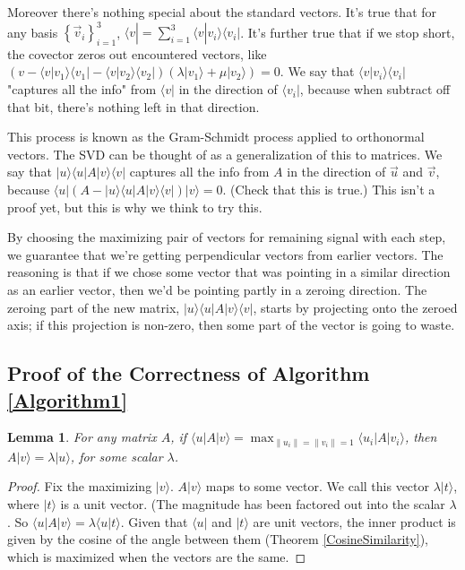 \documentclass{amsbook}
\newtheorem{lemma}[theorem]{Lemma}
\begin{document}
\begin{tcolorbox}[title=Example: Covector Analogy,colback=blue!5]
Moreover there's nothing special about the standard vectors.  It's true that for any basis $\left\{\vec v _i\right\}_{i=1}^3$, $\langle v| = \sum_{i=1}^3\langle v| v _i\rangle\langle v _i|$.  It's further true that if we stop short, the covector zeros out encountered vectors, like $\left(v-\langle v| v _1\rangle\langle v _1|-\langle v| v _2\rangle\langle v _2|\right)\left(\lambda| v _1\rangle+\mu| v _2\rangle\right)=0$.  We say that $\langle v| v _i\rangle\langle v _i|$ "captures all the info" from $\langle v|$ in the direction of $\langle v _i|$, because when subtract off that bit, there's nothing left in that direction.

This process is known as the Gram-Schmidt process applied to orthonormal vectors.  The SVD can be thought of as a generalization of this to matrices.  We say that $| u \rangle\langle u |A| v \rangle\langle v |$ captures all the info from  $A$ in the direction of $\vec u $ and $\vec v $, because $\langle u |\left(A-| u \rangle\langle u |A| v \rangle\langle v |\right)| v \rangle=0$.  (Check that this is true.)  This isn't a proof yet, but this is why we think to try this.

By choosing the maximizing pair of vectors for remaining signal with each step, we guarantee that we're getting perpendicular vectors from earlier vectors.  The reasoning is that if we chose some vector that was pointing in a similar direction as an earlier vector, then we'd be pointing partly in a zeroing direction.  The zeroing part of the new matrix, $| u \rangle\langle u |A| v \rangle\langle v |$, starts by projecting onto the zeroed axis; if this projection is non-zero, then some part of the vector is going to waste.
\end{tcolorbox}

\subsection{Proof of the Correctness of Algorithm \ref{Algorithm1}}

\begin{lemma}
\label{MaximalVectorMap}
For any matrix $A$, if $\langle u |A| v \rangle=\max_{\|u_i\|=\|v_i\|=1}\langle u_i |A| v_i \rangle$, then $A| v \rangle=\lambda| u \rangle$, for some scalar $\lambda$.
\end{lemma}

\begin{proof}
Fix the maximizing $|v\rangle$.  $A| v \rangle$ maps to some vector.  We call this vector $\lambda|t\rangle$, where $|t\rangle$ is a unit vector.  (The magnitude has been factored out into the scalar $\lambda$.  So $\langle u |A| v \rangle=\lambda\langle u | t\rangle$.  Given that $\langle u |$ and $| t\rangle$ are unit vectors, the inner product is given by the cosine of the angle between them (Theorem \ref{CosineSimilarity}), which is maximized when the vectors are the same.
\end{proof}
\end{document}
